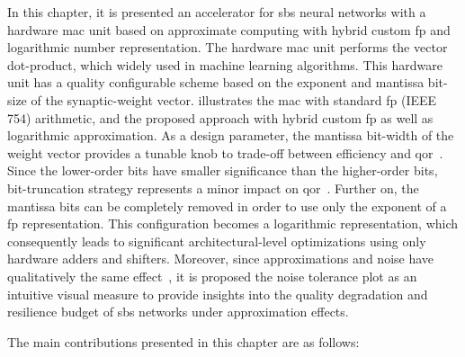 In this chapter, it is presented an accelerator for \gls{sbs} neural networks with a hardware \gls{mac} unit based on approximate computing with hybrid custom \gls{fp}  and logarithmic number representation. The hardware \gls{mac} unit performs the vector dot-product, which widely used in machine learning algorithms. This hardware unit has a quality configurable scheme based on the exponent and mantissa bit-size of the synaptic-weight vector.  illustrates the \gls{mac} with standard \gls{fp} (IEEE 754) arithmetic, and the proposed approach with hybrid custom \gls{fp}  as well as logarithmic approximation. As a design parameter, the mantissa bit-width of the weight vector provides a tunable knob to trade-off between efficiency and \gls{qor}~\cite{park2009dynamic, han2013approximate}. Since the lower-order bits have smaller significance than the higher-order bits, bit-truncation strategy represents a minor impact on \gls{qor}~\cite{gupta2011impact, mittal2016survey}. Further on, the mantissa bits can be completely removed in order to use only the exponent of a \gls{fp} representation. This configuration becomes a logarithmic representation, which consequently leads to significant architectural-level optimizations using only hardware adders and shifters. Moreover, since approximations and noise have qualitatively the same effect~\cite{venkataramani2015approximate}, it is proposed the noise tolerance plot as an intuitive visual measure to provide insights into the quality degradation and resilience budget of \gls{sbs} networks under approximation effects.

The main contributions presented in this chapter are as follows:

